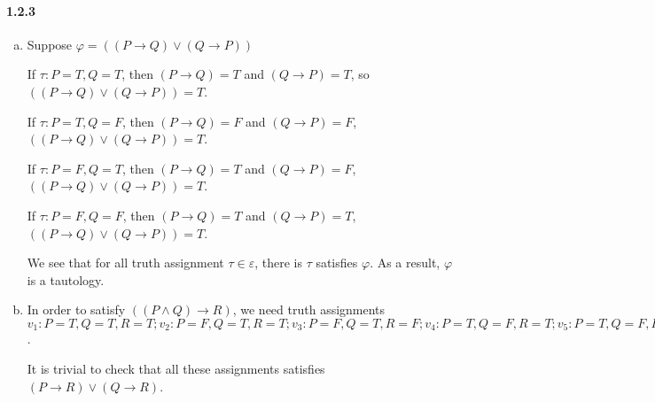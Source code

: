 \documentclass[11pt]{article}
\begin{document}
	\paragraph{1.2.3}
	\begin{enumerate}[(a)]
		\item 
			 Suppose $\varphi = ((P \rightarrow Q) \vee (Q \rightarrow P))$
		
			 If $\tau: P = T, Q = T$, then $(P \rightarrow Q) = T$ and $(Q \rightarrow P) = T$, so $((P \rightarrow Q) \vee (Q \rightarrow P)) = T$.
		
			 If $\tau: P = T, Q = F$, then $(P \rightarrow Q) = F$ and $(Q \rightarrow P) = F$, $((P \rightarrow Q) \vee (Q \rightarrow P)) = T$.
			 
			 If $\tau: P = F, Q = T$, then $(P \rightarrow Q) = T$ and $(Q \rightarrow P) = F$, $((P \rightarrow Q) \vee (Q \rightarrow P)) = T$.
			 
			 If $\tau: P = F, Q = F$, then $(P \rightarrow Q) = T$ and $(Q \rightarrow P) = T$, $((P \rightarrow Q) \vee (Q \rightarrow P)) = T$.
			 
			 We see that for all truth assignment $\tau \in \varepsilon$, there is $\tau$ satisfies $\varphi$. As a result, $\varphi$ is a tautology.
			 
			 \item In order to satisfy $((P \wedge Q)\rightarrow R)$, we need truth assignments $v_1: P = T, Q = T, R = T; v_2: P = F, Q = T, R = T; v_3: P = F, Q =T, R = F; v_4: P = T, Q = F, R = T; v_5: P = T, Q = F, R = F; v_6: P = F, Q =F, R = T; v_7: P = F, Q = F, R = F$.
			 
			 	It is trivial to check that all these assignments satisfies $(P \rightarrow R) \vee (Q \rightarrow R)$.
	\end{enumerate}
\end{document}
